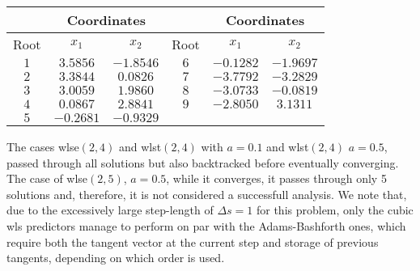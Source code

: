 \begin{table}[b]
	\centering
	\begin{minipage}{0.75\textwidth}
		\label{table:TABLE_CH5EX2_B}
		\small
		\renewcommand{\arraystretch}{1.25}
		\begin{tabular}{c c c c c c}
			\hline\hline
			& \multicolumn{2}{c}{Coordinates} & & 
			\multicolumn{2}{c}{Coordinates} \\
			\hline
			Root  & $x_1$ & $x_2$ &  Root  & $x_1$  & $x_2$ \\
			\hline
			$1$ & $3.5856$ & $-1.8546$ & $6$ & $-0.1282$ & $-1.9697$ \\
			$2$ & $3.3844$ & $0.0826$  & $7$ & $-3.7792$ & $-3.2829$ \\
			$3$ & $3.0059$ & $1.9860$  & $8$ & $-3.0733$ & $-0.0819$ \\
			$4$ & $0.0867$ & $2.8841$  & $9$ & $-2.8050$ & $3.1311$ \\
			$5$ & $-0.2681$ & $-0.9329$ &  &  &  \\
			\hline\hline
		\end{tabular}
	\end{minipage}
\end{table}
The cases \acrshort{wlse}$(2,4)$ and \acrshort{wlst}$(2,4)$ with $a=0.1$ and 
\acrshort{wlst}$(2,4)$ $a=0.5$,
passed through all solutions but also backtracked  before eventually converging.
The case of \acrshort{wlse}$(2,5)$, $a=0.5$, while it converges, it passes 
through only 5 
solutions and, therefore, it is not considered a successfull
analysis. We note that, due to the excessively large step-length of $\Delta
s=1$ for this problem, only the cubic \acrshort{wls} predictors manage to 
perform on par with the Adams-Bashforth ones, which require both the tangent 
vector at the current step and storage of previous tangents, depending on which 
order is used.

